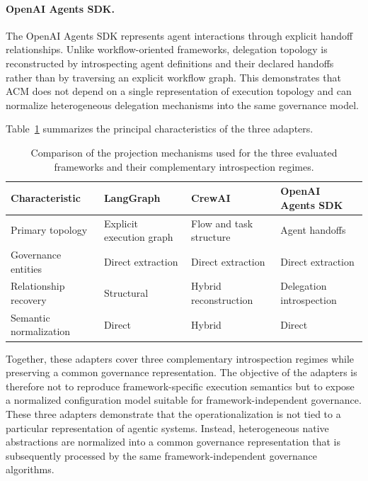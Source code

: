 \documentclass[10pt]{article}
\begin{document}
\paragraph{OpenAI Agents SDK.}

The OpenAI Agents SDK represents agent interactions through explicit handoff relationships. Unlike workflow-oriented frameworks, delegation topology is reconstructed by introspecting agent definitions and their declared handoffs rather than by traversing an explicit workflow graph. This demonstrates that ACM does not depend on a single representation of execution topology and can normalize heterogeneous delegation mechanisms into the same governance model.

Table~\ref{tab:framework_projection_summary} summarizes the principal characteristics of the three adapters.

\begin{table}[t]
	\centering
	\caption{Comparison of the projection mechanisms used for the three evaluated frameworks and their complementary introspection regimes.}
	\label{tab:framework_projection_summary}
	\small
	\begin{tabular}{p{3.0cm}p{2.6cm}p{2.8cm}p{2.8cm}}
		\toprule
		\textbf{Characteristic} &
		\textbf{LangGraph} &
		\textbf{CrewAI} &
		\textbf{OpenAI Agents SDK} \\
		\midrule
		Primary topology &
		Explicit execution graph &
		Flow and task structure &
		Agent handoffs \\
		Governance entities &
		Direct extraction &
		Direct extraction &
		Direct extraction \\
		Relationship recovery &
		Structural &
		Hybrid reconstruction &
		Delegation introspection \\
		Semantic normalization &
		Direct &
		Hybrid &
		Direct \\
		\bottomrule
	\end{tabular}
\end{table}

Together, these adapters cover three complementary introspection regimes while preserving a common governance representation. The objective of the adapters is therefore not to reproduce framework-specific execution semantics but to expose a normalized configuration model suitable for framework-independent governance.
These three adapters demonstrate that the operationalization is not tied to a particular representation of agentic systems. Instead, heterogeneous native abstractions are normalized into a common governance representation that is subsequently processed by the same framework-independent governance algorithms.
\end{document}
